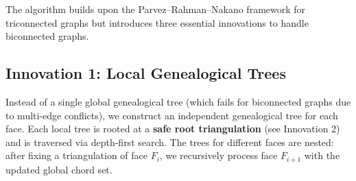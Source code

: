 The algorithm builds upon the Parvez–Rahman–Nakano framework for triconnected graphs but introduces three essential innovations to handle biconnected graphs.

\subsection{Innovation 1: Local Genealogical Trees}
\label{sec:local_trees}

Instead of a single global genealogical tree (which fails for biconnected graphs due to multi-edge conflicts), we construct an independent genealogical tree for each face. 
Each local tree is rooted at a \textbf{safe root triangulation} (see Innovation 2) and is traversed via depth-first search. 
The trees for different faces are nested: after fixing a triangulation of face \(F_i\), we recursively process face \(F_{i+1}\) with the updated global chord set.

